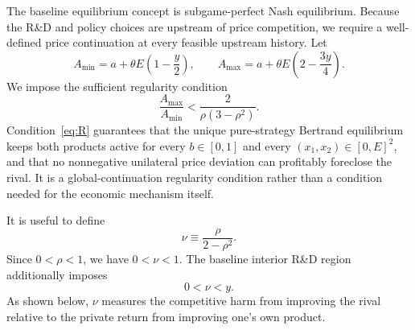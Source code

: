 The baseline equilibrium concept is subgame-perfect Nash equilibrium. Because the R\&D and policy choices are upstream of price competition, we require a well-defined price continuation at every feasible upstream history. Let
\begin{equation}
 A_{\min}=a+\theta E\left(1-\frac y2\right),\qquad
 A_{\max}=a+\theta E\left(2-\frac{3y}{4}\right).
\end{equation}
We impose the sufficient regularity condition
\begin{equation}
 \frac{A_{\max}}{A_{\min}}
 <
 \frac{2}{\rho(3-\rho^2)}.
 \tag{R}\label{eq:R}
\end{equation}
Condition~\eqref{eq:R} guarantees that the unique pure-strategy Bertrand equilibrium keeps both products active for every $b\in[0,1]$ and every $(x_1,x_2)\in[0,E]^2$, and that no nonnegative unilateral price deviation can profitably foreclose the rival. It is a global-continuation regularity condition rather than a condition needed for the economic mechanism itself.

It is useful to define
\begin{equation}
 \nu\equiv\frac{\rho}{2-\rho^2}.
 \label{eq:nu}
\end{equation}
Since $0<\rho<1$, we have $0<\nu<1$. The baseline interior R\&D region additionally imposes
\begin{equation}
 0<\nu<y.
 \label{eq:nuy}
\end{equation}
As shown below, $\nu$ measures the competitive harm from improving the rival relative to the private return from improving one's own product.

